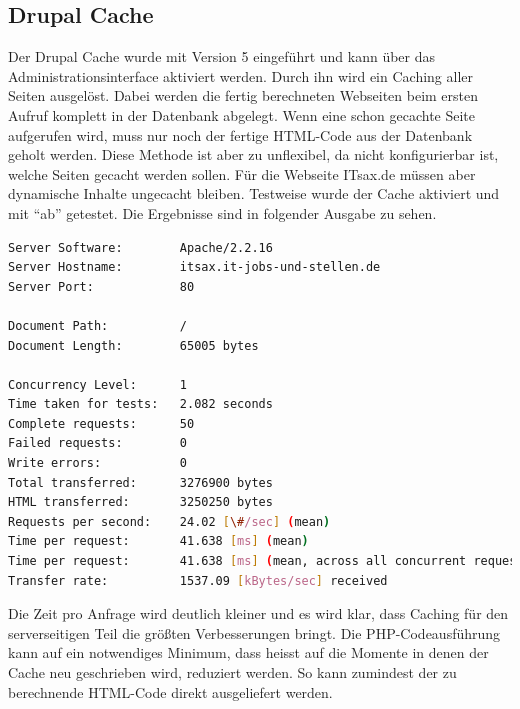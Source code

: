 \subsection{Drupal Cache}Der Drupal Cache wurde mit Version 5 eingef\"uhrt und kann \"uber das Administrationsinterface aktiviert werden. Durch ihn wird ein Caching aller Seiten ausgel\"ost. Dabei werden die fertig berechneten Webseiten beim ersten Aufruf komplett in der Datenbank abgelegt. Wenn eine schon gecachte Seite aufgerufen wird, muss nur noch der fertige HTML-Code aus der Datenbank geholt werden. Diese Methode ist aber zu unflexibel, da nicht konfigurierbar ist, welche Seiten gecacht werden sollen. F\"ur die Webseite ITsax.de m\"ussen aber dynamische Inhalte ungecacht bleiben. Testweise wurde der Cache aktiviert und mit "`ab"' getestet. Die Ergebnisse sind in folgender Ausgabe zu sehen. 
\begin{minipage}[t]{1\textwidth}
\begin{lstlisting}[language=bash,label=Drupal Cache gemessen mit ab,caption=Drupal Cache gemessen mit ab]
Server Software:        Apache/2.2.16
Server Hostname:        itsax.it-jobs-und-stellen.de
Server Port:            80

Document Path:          /
Document Length:        65005 bytes

Concurrency Level:      1
Time taken for tests:   2.082 seconds
Complete requests:      50
Failed requests:        0
Write errors:           0
Total transferred:      3276900 bytes
HTML transferred:       3250250 bytes
Requests per second:    24.02 [\#/sec] (mean)
Time per request:       41.638 [ms] (mean)
Time per request:       41.638 [ms] (mean, across all concurrent requests)
Transfer rate:          1537.09 [kBytes/sec] received
\end{lstlisting}
\end{minipage}
Die Zeit pro Anfrage wird deutlich kleiner und es wird klar, dass Caching f\"ur den serverseitigen Teil die gr\"o\ss{}ten Verbesserungen bringt. Die PHP-Codeausführung kann auf ein notwendiges Minimum, dass heisst auf die Momente in denen der Cache neu geschrieben wird, reduziert werden. So kann zumindest der zu berechnende HTML-Code direkt ausgeliefert werden.

